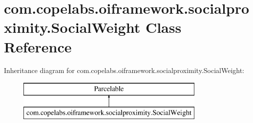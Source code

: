 \hypertarget{classcom_1_1copelabs_1_1oiframework_1_1socialproximity_1_1_social_weight}{}\section{com.\+copelabs.\+oiframework.\+socialproximity.\+Social\+Weight Class Reference}
\label{classcom_1_1copelabs_1_1oiframework_1_1socialproximity_1_1_social_weight}
Inheritance diagram for com.\+copelabs.\+oiframework.\+socialproximity.\+Social\+Weight\+:\begin{figure}[H]
\begin{center}
\leavevmode
\includegraphics[height=2.000000cm]{classcom_1_1copelabs_1_1oiframework_1_1socialproximity_1_1_social_weight}
\end{center}
\end{figure}
